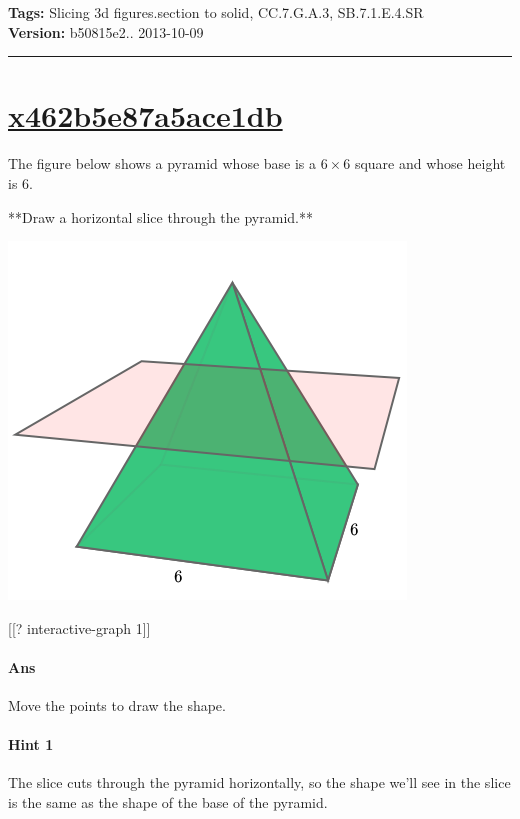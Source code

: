 \documentclass[twocolumn,10pt]{article}
\def\shrinkfactor{0.4}
\begin{document}
\medskip
\noindent
\textbf{Tags:} {\footnotesize Slicing 3d figures.section to solid, CC.7.G.A.3, SB.7.1.E.4.SR}\\
\textbf{Version:} b50815e2.. 2013-10-09
\smallskip\hrule





\section{\href{https://www.khanacademy.org/devadmin/content/items/x462b5e87a5ace1db}{x462b5e87a5ace1db}}

\noindent
The figure below shows a pyramid whose base is a $6\times 6$ square and whose height is $6$.   

**Draw \DIFdelbegin {}\DIFdelend \DIFaddbegin {}\DIFaddend a horizontal slice through the pyramid.**


\includegraphics[scale=\shrinkfactor]{figures/4e6db0b061f7d0aaab47e90516b4d1a2b8bb2023.png}

[[? interactive-graph 1]] 

\paragraph{Ans} Move the points to draw the shape. 

\paragraph{Hint 1}The slice cuts through the pyramid horizontally, so the shape we'll see in the slice is the same as the shape of the base of the pyramid.
\end{document}
